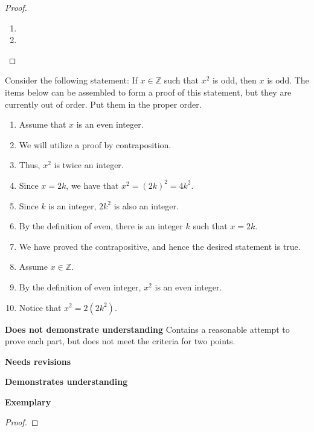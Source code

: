 \documentclass[letterpaper, 11pt]{../ximera}
\begin{document}
\begin{proof}
 	\begin{enumerate}[label=(\alph*)]
		\item %
		\item %
	\end{enumerate}
\end{proof}

\begin{ex}
Consider the following statement: If $x\in\mathbb{Z}$ such that $x^2$ is odd, then $x$ is odd.
The items below can be assembled to form a proof of this statement, but they are currently out of order.  Put them in the proper order.
\begin{enumerate}
	\item Assume that $x$ is an even integer.
	\item We will utilize a proof by contraposition.
	\item Thus, $x^2$ is twice an integer.
	\item Since $x=2k$, we have that $x^2 =(2k)^2 =4k^2$.
	\item Since $k$ is an integer, $2k^2$ is also an integer.
	\item By the definition of even, there is an integer $k$ such that $x=2k$.
	\item We have proved the contrapositive, and hence the desired statement is true.
	\item Assume $x\in \mathbb{Z}$.
	\item By the definition of even integer, $x^2$ is an even integer.
	\item Notice that $x^2 = 2(2k^2)$.
\end{enumerate}
\end{ex}

\begin{writeRubric}
    \item \textbf{Does not demonstrate understanding}
     Contains a reasonable attempt to prove each part, but does not meet the criteria for two points.
    \item \textbf{Needs revisions}
     
    \item \textbf{Demonstrates understanding}
    
    \item \textbf{Exemplary}
        
\end{writeRubric}
                                       \begin{proof}%
\end{proof}


	
\end{document}
